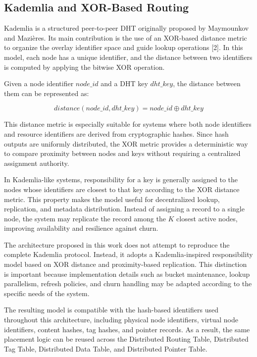 \documentclass[12pt]{article}
\begin{document}
\subsection{Kademlia and XOR-Based Routing}

Kademlia is a structured peer-to-peer DHT originally proposed by Maymounkov and
Mazi\`eres. Its main contribution is the use of an XOR-based distance metric to
organize the overlay identifier space and guide lookup operations
[2]. In this model, each node has a unique identifier,
and the distance between two identifiers is computed by applying the bitwise XOR
operation.

Given a node identifier \(node\_id\) and a DHT key \(dht\_key\), the distance between
them can be represented as:

\[
distance(node\_id, dht\_key) = node\_id \oplus dht\_key
\]

This distance metric is especially suitable for systems where both node identifiers
and resource identifiers are derived from cryptographic hashes. Since hash outputs
are uniformly distributed, the XOR metric provides a deterministic way to compare
proximity between nodes and keys without requiring a centralized assignment
authority.

In Kademlia-like systems, responsibility for a key is generally assigned to the
nodes whose identifiers are closest to that key according to the XOR distance
metric. This property makes the model useful for decentralized lookup, replication,
and metadata distribution. Instead of assigning a record to a single node, the
system may replicate the record among the \(K\) closest active nodes, improving
availability and resilience against churn.

The architecture proposed in this work does not attempt to reproduce the complete
Kademlia protocol. Instead, it adopts a Kademlia-inspired responsibility model based
on XOR distance and proximity-based replication. This distinction is important
because implementation details such as bucket maintenance, lookup parallelism,
refresh policies, and churn handling may be adapted according to the specific needs
of the system.

The resulting model is compatible with the hash-based identifiers used throughout
this architecture, including physical node identifiers, virtual node identifiers,
content hashes, tag hashes, and pointer records. As a result, the same placement
logic can be reused across the Distributed Routing Table, Distributed Tag Table,
Distributed Data Table, and Distributed Pointer Table.
\end{document}
